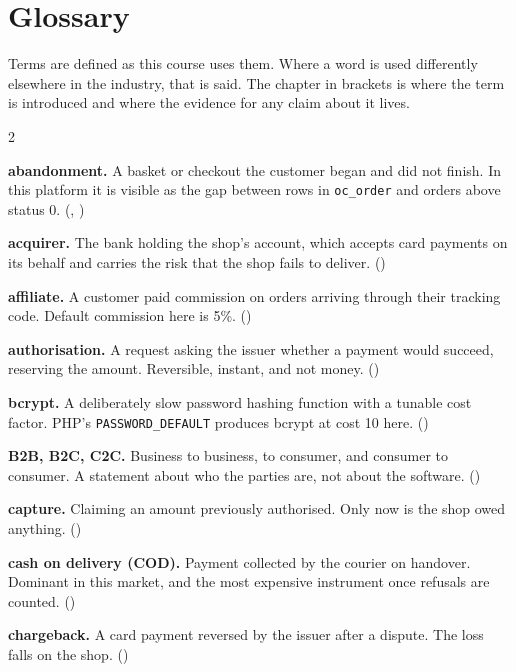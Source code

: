 \chapter{Glossary}\label{app:glossary}
\normalfigures

Terms are defined as this course uses them. Where a word is used differently
elsewhere in the industry, that is said. The chapter in brackets is where the
term is introduced and where the evidence for any claim about it lives.

\begin{multicols}{2}
\small
\raggedright

\textbf{abandonment.} A basket or checkout the customer began and did not
finish. In this platform it is visible as the gap between rows in
\texttt{oc\_order} and orders above status 0. (,
)

\textbf{acquirer.} The bank holding the shop's account, which accepts card
payments on its behalf and carries the risk that the shop fails to deliver.
()

\textbf{affiliate.} A customer paid commission on orders arriving through
their tracking code. Default commission here is 5\%. ()

\textbf{authorisation.} A request asking the issuer whether a payment would
succeed, reserving the amount. Reversible, instant, and not money.
()

\textbf{bcrypt.} A deliberately slow password hashing function with a tunable
cost factor. PHP's \texttt{PASSWORD\_DEFAULT} produces bcrypt at cost 10 here.
()

\textbf{B2B, B2C, C2C.} Business to business, to consumer, and consumer to
consumer. A statement about who the parties are, not about the software.
()

\textbf{capture.} Claiming an amount previously authorised. Only now is the
shop owed anything. ()

\textbf{cash on delivery (COD).} Payment collected by the courier on handover.
Dominant in this market, and the most expensive instrument once refusals are
counted. ()

\textbf{chargeback.} A card payment reversed by the issuer after a dispute.
The loss falls on the shop. ()


\end{multicols}
